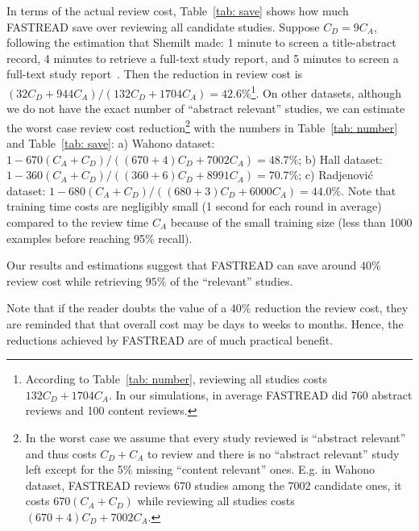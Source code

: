 \documentclass{svjour3}
\theoremstyle{break}
\begin{document}
In terms of the actual review cost,
Table~\ref{tab: save} shows how much FASTREAD save over reviewing all candidate studies. Suppose $C_D=9C_A$, following the estimation that Shemilt made: 1 minute to screen a title-abstract record, 4 minutes to retrieve a full-text study report, and 5 minutes to screen a full-text study report~\cite{shemilt2016use}. Then the reduction in review cost is $(32C_D+944C_A)/(132C_D+1704C_A) = 42.6\%$\footnote{According to Table~\ref{tab: number}, reviewing all studies costs $132C_D+1704C_A$. In our simulations, in average FASTREAD did 760 abstract reviews and 100 content reviews.}. On other datasets, although we do not have the exact number of ``abstract relevant'' studies, we can estimate the worst case review cost reduction\footnote{In the worst case we assume that every study reviewed is ``abstract relevant'' and thus costs $C_D+C_A$ to review and there is no ``abstract relevant'' study left except for the 5\% missing ``content relevant'' ones. E.g. in Wahono dataset, FASTREAD reviews 670 studies among the 7002 candidate ones, it costs $670(C_A+C_D)$ while reviewing all studies costs $(670+4)C_D+7002C_A$.} with the numbers in Table~\ref{tab: number} and Table~\ref{tab: save}: a) Wahono dataset: $1-670(C_A+C_D)/((670+4)C_D+7002C_A) = 48.7\%$; b) Hall dataset: $1-360(C_A+C_D)/((360+6)C_D+8991C_A) = 70.7\%$; c) Radjenovi{\'c} dataset: $1-680(C_A+C_D)/((680+3)C_D+6000C_A) = 44.0\%$. 
Note that training time costs are negligibly small (1 second for each round in average) compared to the review time $C_A$ because of the small training size (less than 1000 examples before reaching 95\% recall). 

\begin{lesson}
    Our results and estimations suggest that FASTREAD can save around $40\%$ review cost while retrieving $95\%$ of the ``relevant'' studies.
\end{lesson}

Note that if the reader doubts the value of a 40\% reduction the review cost, they are reminded that that overall cost may be days to weeks to months. Hence, the reductions achieved by FASTREAD are of much practical benefit.
\end{document}
